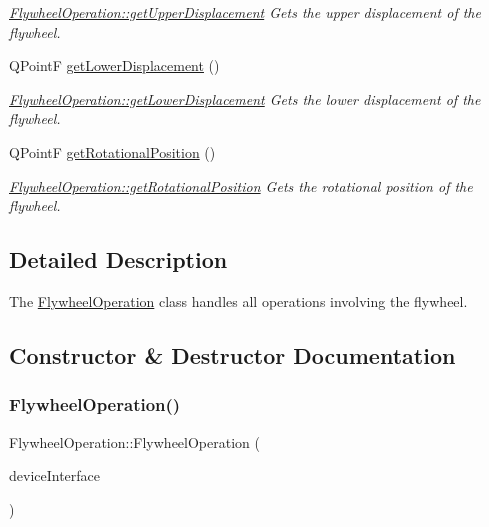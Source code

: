 \begin{DoxyCompactItemize}
\begin{DoxyCompactList}\small\item\em \hyperlink{class_flywheel_operation_a16ebc2fe8c3297350eaf9be2114a75c8}{Flywheel\+Operation\+::get\+Upper\+Displacement} Gets the upper displacement of the flywheel. \end{DoxyCompactList}\item 
Q\+PointF \hyperlink{class_flywheel_operation_a2b9d24d0fbbf1d9cb79bb0aa54f6f6ae}{get\+Lower\+Displacement} ()
\begin{DoxyCompactList}\small\item\em \hyperlink{class_flywheel_operation_a2b9d24d0fbbf1d9cb79bb0aa54f6f6ae}{Flywheel\+Operation\+::get\+Lower\+Displacement} Gets the lower displacement of the flywheel. \end{DoxyCompactList}\item 
Q\+PointF \hyperlink{class_flywheel_operation_a0e1ba213763760cf0128dfdc8436cfdf}{get\+Rotational\+Position} ()
\begin{DoxyCompactList}\small\item\em \hyperlink{class_flywheel_operation_a0e1ba213763760cf0128dfdc8436cfdf}{Flywheel\+Operation\+::get\+Rotational\+Position} Gets the rotational position of the flywheel. \end{DoxyCompactList}\end{DoxyCompactItemize}


\subsection{Detailed Description}
The \hyperlink{class_flywheel_operation}{Flywheel\+Operation} class handles all operations involving the flywheel. 

\subsection{Constructor \& Destructor Documentation}
\hypertarget{class_flywheel_operation_aca3144bf0bb443aaa8a2779624d2a5b2}{}\label{class_flywheel_operation_aca3144bf0bb443aaa8a2779624d2a5b2} 
\subsubsection{\texorpdfstring{Flywheel\+Operation()}{FlywheelOperation()}}
{\footnotesize\ttfamily Flywheel\+Operation\+::\+Flywheel\+Operation (\begin{DoxyParamCaption}\item[{\hyperlink{class_common_device_interface}{Common\+Device\+Interface} $\ast$}]{device\+Interface }\end{DoxyParamCaption})}



